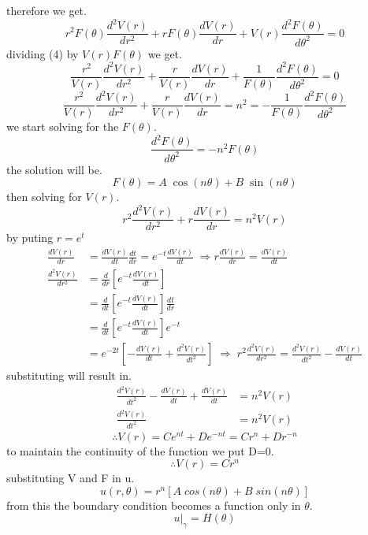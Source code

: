 \documentclass[]{article}
\begin{document}
therefore we get.
\begin{equation}
r^2F(\theta)\frac{d^2 V(r)}{dr^2} +rF(\theta)\frac{d V(r)}{dr} + V(r)\frac{d^2 F(\theta)}{d\theta^2} = 0
\end{equation}
dividing (4) by $V(r)F(\theta)$ we get.
\begin{equation}
\frac{r^2}{V(r)}\frac{d^2 V(r)}{dr^2} +\frac{r}{V(r)}\frac{d V(r)}{dr} + \frac{1}{F(\theta)}\frac{d^2 F(\theta)}{d\theta^2} = 0
\end{equation}
\[
    \frac{r^2}{V(r)}\frac{d^2 V(r)}{dr^2} +\frac{r}{V(r)}\frac{d V(r)}{dr} = n^2 = -\frac{1}{F(\theta)}\frac{d^2 F(\theta)}{d\theta^2}    
\]
we start solving for the $F(\theta)$. 
\[
    \frac{d^2 F(\theta)}{d\theta^2} = -n^2F(\theta)    
\]
the solution will be. 
\begin{equation}
F(\theta) = A\;\cos(n\theta)+B\;\sin(n\theta)
\end{equation}
then solving for $V(r)$.
\[
r^2\frac{d^2 V(r)}{dr^2} +r\frac{d V(r)}{dr} = n^2V(r)    
\]
by puting $r = e^t$
\begin{align*}
\frac{dV(r)}{dr} &= \frac{dV(r)}{dt}\frac{dt}{dr} = e^{-t} \frac{dV(r)}{dt}\;\Rightarrow  r \frac{dV(r)}{dr}=\frac{dV(r)}{dt}
\\
\frac{d^2V(r)}{dr^2} &= \frac{d}{dr}\left[e^{-t} \frac{dV(r)}{dt}\right]
\\
&=  \frac{d}{dt}\left[e^{-t} \frac{dV(r)}{dt}\right] \frac{dt}{dr} 
\\
&= \frac{d}{dt}\left[e^{-t} \frac{dV(r)}{dt}\right] e^{-t}
\\
&= e^{-2t}\left[-\frac{dV(r)}{dt}+\frac{d^2V(r)}{dt^2}\right] \;\Rightarrow\; r^2\frac{d^2V(r)}{dr^2} = \frac{d^2V(r)}{dt^2}-\frac{dV(r)}{dt}
\end{align*}
substituting will result in.
\begin{align*}
\frac{d^2V(r)}{dt^2}-\frac{dV(r)}{dt}+\frac{dV(r)}{dt}&=n^2V(r)
\\
\frac{d^2V(r)}{dt^2} &= n^2V(r)
\end{align*}
\[
\therefore V(r) = Ce^{nt}+De^{-nt} = Cr^n+Dr^{-n}    
\]
to maintain the continuity of the function we put D=0.
\[
\therefore V(r) = Cr^n
\]
substituting V and F in u.
\begin{equation}
u(r,\theta) = r^n[A\;cos(n\theta)+B\;sin(n\theta)]
\end{equation}
from this the boundary condition becomes a function only in $\theta$.
\begin{equation}
u|_\gamma = H(\theta)
\end{equation}
\end{document}

